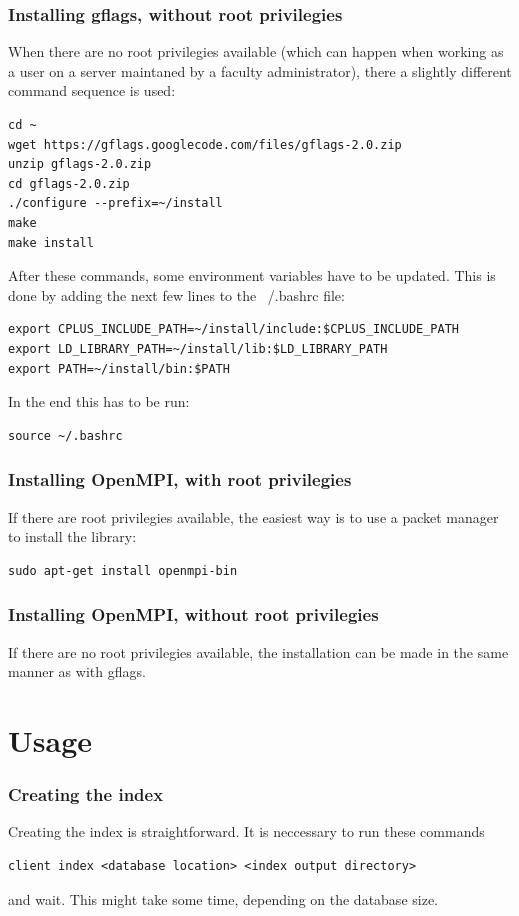 \documentclass[times, utf8, diplomski]{fer}
\begin{document}
\subsubsection{Installing gflags, without root privilegies}
When there are no root privilegies available (which can happen when working as a user on a server maintaned by a faculty administrator), there a slightly different command sequence is used:
\begin{lstlisting}
cd ~
wget https://gflags.googlecode.com/files/gflags-2.0.zip
unzip gflags-2.0.zip
cd gflags-2.0.zip
./configure --prefix=~/install
make
make install
\end{lstlisting}
After these commands, some environment variables have to be updated. This is done by adding the next few lines to the ~/.bashrc file:
\begin{lstlisting}
export CPLUS_INCLUDE_PATH=~/install/include:$CPLUS_INCLUDE_PATH
export LD_LIBRARY_PATH=~/install/lib:$LD_LIBRARY_PATH
export PATH=~/install/bin:$PATH
\end{lstlisting}
In the end this has to be run:
\begin{lstlisting}
source ~/.bashrc
\end{lstlisting}

\subsubsection{Installing OpenMPI, with root privilegies}

If there are root privilegies available, the easiest way is to use a packet manager to install the library:
\begin{lstlisting}
sudo apt-get install openmpi-bin
\end{lstlisting}

\subsubsection{Installing OpenMPI, without root privilegies}
If there are no root privilegies available, the installation can be made in the same manner as with gflags.

\section{Usage}

\subsubsection{Creating the index}
Creating the index is straightforward. It is neccessary to run these commands
\begin{lstlisting}
client index <database location> <index output directory>
\end{lstlisting}
and wait. This might take some time, depending on the database size.
\end{document}
